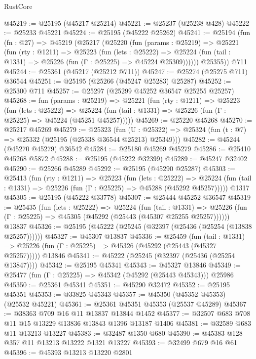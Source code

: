 \begin{lexlean}{RustCore}
\begin{coremodule}
@45219 := @25195 (@45217 @25214)
@45221 := @25237 (@25238 @428)
@45222 := @25233 @45221
@45224 := @25195 (@45222 @25262)
@45241 := @25194
    (fun (fn : @27) =>
    @45219
      (@25217
        (@25220
          (fun (params : @25219) =>
          @25221
            (fun (rty : @1211) =>
            @25223
              (fun (lets : @25222) =>
              @25224 (fun (tail : @1331) => @25226 (fun (Γ : @25225) => @45224 @25309))))))
        @25355))
    @711
@45244 := @25361 (@45217 (@25212 @711))
@45247 := @25274 (@25275 @711) @36544
@45251 := @25195 (@25266 (@45247 @25283) @25287)
@45252 := @25300 @711
@45257 := @25297 (@25299 @45252 @36547 @25255 @25257)
@45268 := fun (params : @25219) =>
  @25221
    (fun (rty : @1211) =>
    @25223
      (fun (lets : @25222) =>
      @25224 (fun (tail : @1331) => @25226 (fun (Γ : @25225) => @45224 (@45251 @45257)))))
@45269 := @25220 @45268
@45270 := @25217 @45269
@45279 := @25323
    (fun (U : @25322) => @25324 (fun (t : @7) => @25332 (@25195 (@25338 @36544 @25213) @25349)))
@45282 := @45244 (@45270 @45279) @36542
@45284 := @25180 @45269 @45279
@45286 := @25410 @45268 @5872
@45288 := @25195 (@45222 @32399)
@45289 := @45247 @32402
@45290 := @25266 @45289
@45292 := @25195 (@45290 @25287)
@45303 := @25413
    (fun (rty : @1211) =>
    @25223
      (fun (lets : @25222) =>
      @25224 (fun (tail : @1331) => @25226 (fun (Γ : @25225) => @45288 (@45292 @45257)))))
    @1317
@45305 := @25195 (@45222 @33778)
@45307 := @25444 @45252 @36547
@45319 := @25435
    (fun (lets : @25222) =>
    @25224
      (fun (tail : @1331) =>
      @25226 (fun (Γ : @25225) => @45305 (@45292 (@25443 (@45307 @25255 @25257))))))
    @13837
@45326 := @25195 (@45222 (@25245 (@32397 (@25436 (@25254 (@13838 @25257))))))
@45327 := @45307 @13837
@45336 := @25459
    (fun (tail : @1331) => @25226 (fun (Γ : @25225) => @45326 (@45292 (@25443 (@45327 @25257)))))
    @13846
@45341 := @45222 (@25245 (@32397 (@25436 (@25254 @13847))))
@45342 := @25195 @45341
@45343 := @45327 @13846
@45349 := @25477 (fun (Γ : @25225) => @45342 (@45292 (@25443 @45343))) @25986
@45350 := @25361 @45341
@45351 := @45290 @32472
@45352 := @25195 @45351
@45353 := @33825 @45343
@45357 := @45350 (@45352 @45353) (@25532 @45221)
@45361 := @25361 @45351 @45353 (@25537 @45289)
@45367 := @38363 @709 @16 @11 @13837 @13844 @1452
@45377 := @32507 @683 @708 @11 @15 @13229 @13836 @13843 @1396 @13187 @1406
@45381 := @32589 @683 @11 @13213 @13227
@45383 := @32487 @1350 @680
@45390 := @45383 @128 @357 @11 @13213 @13222 @1321 @13227
@45393 := @32499 @679 @16 @61
@45396 := @45393 @13213 @13220 @2801

\end{coremodule}
\end{lexlean}
